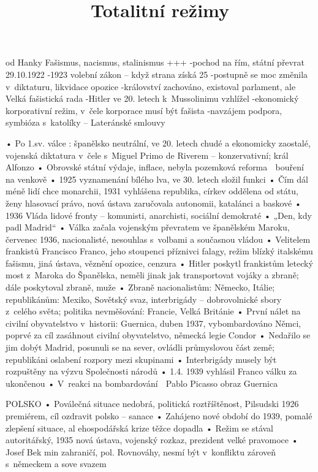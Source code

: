 \documentclass{article}
\title{\vspace{-2cm}Totalitní režimy\vspace{-1.7cm}}
\date{}
\author{}
\begin{document}
\maketitle

od Hanky
Fašismus, nacismus, stalinismus
+++
-pochod na řím, státní převrat 29.10.1922
-1923 volební zákon – když strana získá 25 %
-postupně se moc změnila v diktaturu, likvidace opozice
-království zachováno, existoval parlament, ale Velká fašistická rada
-Hitler ve 20. letech k Mussolinimu vzhlížel
-ekonomický korporativní režim, v čele korporace musí být fašista
-navzájem podpora, symbióza s katolíky – Lateránské smlouvy

• Po 1.sv. válce : španělsko neutrální, ve 20. letech chudé a ekonomicky zaostalé, vojenská diktatura v čele s Miguel Primo de Riverem – konzervativní; král Alfonzo
• Obrovské státní výdaje, inflace, nebyla pozemková reforma  bouření na venkově
• 1925 vyznamenání bílého lva, ve 30. letech složil funkci
• Čím dál méně lidí chce monarchii, 1931 vyhlášena republika, církev oddělena od státu, ženy hlasovací právo, nová ústava zaručovala autonomii, katalánci a baskové
• 1936 Vláda lidové fronty – komunisti, anarchisti, sociální demokraté
• „Den, kdy padl Madrid“
• Válka začala vojenským převratem ve španělském Maroku, červenec 1936, nacionalisté, nesouhlas s volbami a současnou vládou
• Velitelem frankistů Francisco Franco, jeho stoupenci příznivci falagy, režim blízký italskému fašismu, jiná ústava, věznění opozice, cenzura
• Hitler poskytl frankistům letecký most z Maroka do Španělska, neměli jinak jak transportovat vojáky a zbraně; dále poskytoval zbraně, muže
• Zbraně nacionalistům: Německo, Itálie; republikánům: Mexiko, Sovětský svaz, interbrigády – dobrovolnické sbory z celého světa; politika nevměšování: Francie, Velká Británie
• První nálet na civilní obyvatelstvo v historii: Guernica, duben 1937, vybombardováno Němci, poprvé za cíl zasáhnout civilní obyvatelstvo, německá legie Condor
• Nedařilo se jim dobýt Madrid, posunuli se na sever, ovládli průmyslovou část země; republikáni oslabení rozpory mezi skupinami
• Interbrigády musely být rozpuštěny na výzvu Společnosti národů
• 1.4. 1939 vyhlásil Franco válku za ukončenou
• V reakci na bombardování  Pablo Picasso obraz Guernica

POLSKO
    • Poválečná situace nedobrá, politická roztříštěnost, Pilsudski 1926 premiérem, cíl ozdravit polsko – sanace
    • Zahájeno nové období do 1939, pomalé zlepšení situace, al ehospodářská krize těžce dopadla
    • Režim se stával autoritářský, 1935 nová ústava, vojenský rozkaz, prezident velké pravomoce
    • Josef Bek min zahraničí, pol. Rovnováhy, nesmí být v konfliktu zároveň s německem a sove svazem
\end{document}
